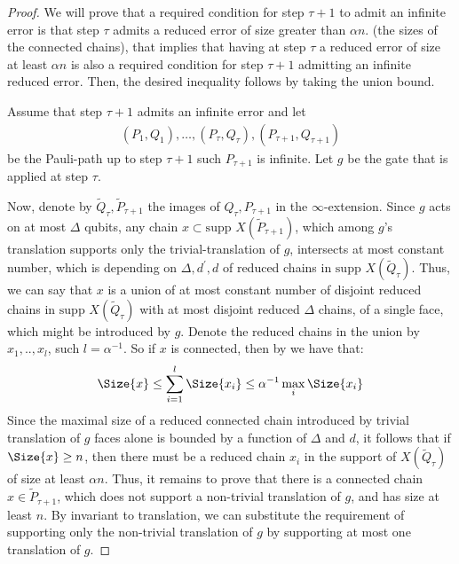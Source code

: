 \begin{proof}
  We will prove that a required condition for step $\tau+1$ to admit an infinite error is that step $\tau$ admits a reduced error of size greater than $\alpha n$. (the sizes of the connected chains), that implies that having at step $\tau$ a reduced error of size at least $\alpha n$ is also a required condition for step $\tau+1$ admitting an infinite reduced error. Then, the desired inequality follows by taking the union bound.

  Assume that step $\tau+1$ admits an infinite error and let 
  \begin{equation*}
    \begin{split}
  (P_{1},Q_{1}), \ldots, (P_{\tau},Q_{\tau}), (P_{\tau+1},Q_{\tau+1}) 
    \end{split}
  \end{equation*}
  be the Pauli-path up to step $\tau+1$ such $P_{\tau+1}$ is infinite. Let $g$ be the gate that is applied at step $\tau$. 


Now, denote by $\tilde{Q}_{\tau}, \tilde{P}_{\tau+1}$ the images of $Q_{\tau}, P_{\tau+1}$ in the $\infty$-extension. Since $g$ acts on at most $\Delta$ qubits, any chain $x \subset \text{supp } X(\tilde{P}_{\tau+1})$, which among $g$'s translation supports only the trivial-translation of $g$, intersects at most constant number, which is depending on $\Delta, d^{\prime},d $ of  reduced chains in $\text{supp } X(\tilde{Q}_{\tau})$. Thus, we can say that $x$ is a union of at most constant number of disjoint reduced chains in $\text{supp } X(\tilde{Q}_{\tau})$ with at most disjoint reduced $\Delta$ chains, of a single face, which might be introduced by $g$. Denote the reduced chains in the union by $x_{1},..,x_{l}$, such $l = \alpha^{-1}$. So if $x$ is connected, then by  we have that:
\begin{equation*}
  \begin{split}
    \Size{x} \le \sum_{i=1}^{l} \Size{x_{i} }\le \alpha^{-1} \max_{i}\Size{x_{i}}
  \end{split}
\end{equation*}
Since the maximal size of a reduced connected chain introduced by trivial translation of $g$ faces alone is bounded by a function of $\Delta$ and $d$, it follows that if $\Size{x} \ge n$, then there must be a reduced chain $x_{i}$ in the support of $X(\tilde{Q}_{\tau})$ of size at least $\alpha n$.
Thus, it remains to prove that there is a connected chain $x \in \tilde{P}_{\tau+1}$, which does not support a non-trivial translation of $g$, and has size at least $n$. By invariant to translation, we can substitute the requirement of supporting only the non-trivial translation of $g$ by supporting at most one translation of $g$.





\end{proof}

